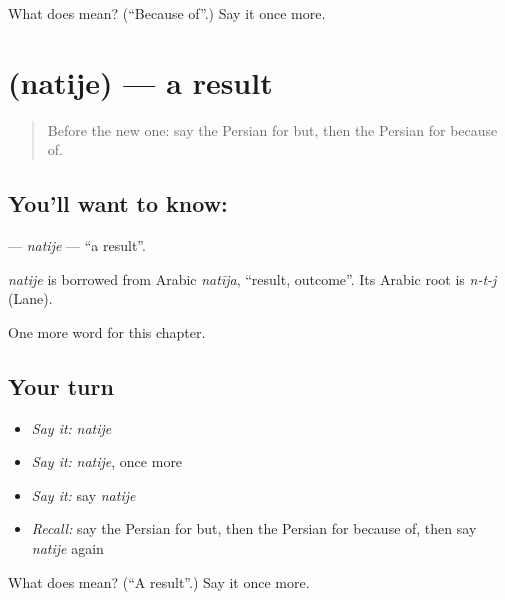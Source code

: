 \begin{tcolorbox}[breakable,colback=teal!4,colframe=teal!35!black,title={Before you move on}]
What does   mean? (\textquotedblleft{}Because of\textquotedblright{}.) Say it once more.
\end{tcolorbox}
\section[\texorpdfstring{\fa{نتیجه} (natije)}{نتیجه (natije)}]{ (natije) — a result}

\label{lesson:FA-C158-natije}



\begin{quote}
Before the new one: say the Persian for but, then the Persian for because of.
\end{quote}

\subsection*{You'll want to know: }
\textbf{} — \emph{natije} — \textquotedblleft{}a result\textquotedblright{}.

\begin{cousinweb}
\emph{natije} is borrowed from Arabic \emph{natīja}, \textquotedblleft{}result, outcome\textquotedblright{}. Its Arabic root is \emph{n-t-j} (Lane).
\end{cousinweb}

\begin{grammarlens}[title={What you've built}]
One more word for this chapter.
\end{grammarlens}

\subsection*{Your turn}
\begin{itemize}
\raggedright
  \item \emph{Say it:} \emph{natije}
  \item \emph{Say it:} \emph{natije}, once more
  \item \emph{Say it:} say \emph{natije}
  \item \emph{Recall:} say the Persian for but, then the Persian for because of, then say \emph{natije} again
\end{itemize}

\begin{tcolorbox}[breakable,colback=teal!4,colframe=teal!35!black,title={Before you move on}]
What does  mean? (\textquotedblleft{}A result\textquotedblright{}.) Say it once more.
\end{tcolorbox}
